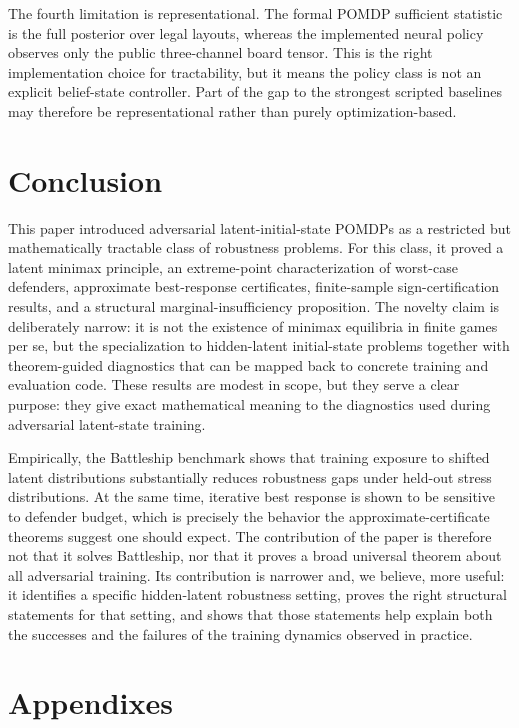 \documentclass[11pt]{article}
\begin{document}
The fourth limitation is representational. The formal POMDP sufficient statistic is the full posterior over legal layouts, whereas the implemented neural policy observes only the public three-channel board tensor. This is the right implementation choice for tractability, but it means the policy class is not an explicit belief-state controller. Part of the gap to the strongest scripted baselines may therefore be representational rather than purely optimization-based.

\section{Conclusion}

This paper introduced adversarial latent-initial-state POMDPs as a restricted but mathematically tractable class of robustness problems. For this class, it proved a latent minimax principle, an extreme-point characterization of worst-case defenders, approximate best-response certificates, finite-sample sign-certification results, and a structural marginal-insufficiency proposition. The novelty claim is deliberately narrow: it is not the existence of minimax equilibria in finite games per se, but the specialization to hidden-latent initial-state problems together with theorem-guided diagnostics that can be mapped back to concrete training and evaluation code. These results are modest in scope, but they serve a clear purpose: they give exact mathematical meaning to the diagnostics used during adversarial latent-state training.

Empirically, the Battleship benchmark shows that training exposure to shifted latent distributions substantially reduces robustness gaps under held-out stress distributions. At the same time, iterative best response is shown to be sensitive to defender budget, which is precisely the behavior the approximate-certificate theorems suggest one should expect. The contribution of the paper is therefore not that it solves Battleship, nor that it proves a broad universal theorem about all adversarial training. Its contribution is narrower and, we believe, more useful: it identifies a specific hidden-latent robustness setting, proves the right structural statements for that setting, and shows that those statements help explain both the successes and the failures of the training dynamics observed in practice.

\clearpage
\section{Appendixes}
\end{document}
